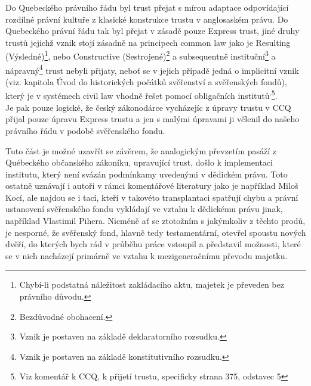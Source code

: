 \documentclass{article}
\begin{document}

Do Quebeckého právního řádu byl trust přejat s mírou adaptace odpovídající rozdílné právní kultuře z klasické konstrukce trustu v anglosaském právu. Do Quebeckého právní řádu tak byl přejat v zásadě pouze Express trust, jiné druhy trustů jejichž vznik stojí zásadně na principech common law jako je Resulting (Výsledné)\footnote{Chybí-li podstatná náležitost zakládacího aktu, majetek je převeden bez právního důvodu.}, nebo Constructive (Sestrojené)\footnote{Bezdůvodné obohacení.} a subsequentně instituční\footnote{Vznik je postaven na základě deklaratorního rozsudku.} a nápravný\footnote{Vznik je postaven na základě konstitutivního rozsudku.} trust nebyli přijaty, neboť se v jejich případě jedná o implicitní vznik (viz. kapitola Úvod do historických počátků svěřenství a svěřenských fondů), který je v systémech civil law vhodně řešet pomocí obligačních institutů\textsuperscript{,}\footnote{Viz komentář k CCQ, k přijetí trustu, specificky strana 375, odstavec 5}.\\

Je pak pouze logické, že český zákonodárce vycházejíc z úpravy trustu v CCQ přijal pouze úpravu Express trustu a jen s malými úpravami ji včlenil do našeho právního řádu v podobě svěřenského fondu.

Tuto část je možné uzavřít se závěrem, že analogickým převzetím pasáží z Québeckého občanského zákoníku, upravující trust, došlo k implementaci institutu, který není svázán podmínkamy uvedenými v dědickém právu. Toto ostatně uznávají i autoři v rámci komentářové literatury jako je například Miloš Kocí, ale najdou se i tací, kteří v takovéto transplantaci spatřují chybu a právní ustanovení svěřenského fondu vykládají ve vztahu k dědickému právu jinak, například Vlastimil Pihera. Nicméně ať se ztotožním s jakýmkoliv z těchto prodů, je nesporné, že svěřenský fond, hlavně tedy testamentární, otevřel spoustu nových dvěří, do kterých bych rád v průběhu práce vstoupil a představil možnosti, které se v nich nacházejí primárně ve vztahu k mezigeneračnímu převodu majetku.\\

\end{document}
